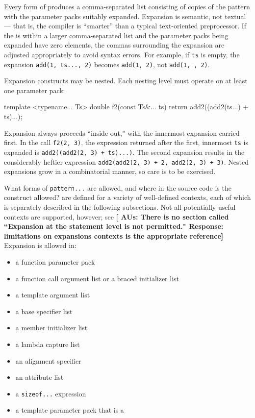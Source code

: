\noindent Every form of  produces a comma-separated list
consisting of copies of the pattern with the parameter packs suitably
expanded. Expansion is semantic, not textual --- that is, the compiler
is ``smarter'' than a typical text-oriented preprocessor. If the
 is within a larger comma-separated list and the
parameter packs being expanded have zero elements, the commas
surrounding the expansion are adjusted appropriately to avoid syntax
errors. For example, if \lstinline!ts! is empty, the expansion
\lstinline!add(1,!~\lstinline!ts...,!~\lstinline!2)! becomes
\lstinline!add(1,!~\lstinline!2)!, not \lstinline!add(1,!~\lstinline!,!~\lstinline!2)!.

Expansion constructs may be nested. Each nesting level must operate on
at least one parameter pack:

\begin{emcppslisting}[emcppsbatch=e25]
template <typename... Ts>
double f2(const Ts&... ts)
{
    return add2((add2(ts...) + ts)...);
}
\end{emcppslisting}
    

\noindent Expansion always proceeds ``inside out,'' with the innermost expansion
carried first. In the call \lstinline!f2(2,!~\lstinline!3)!, the expression
returned after the first, innermost \lstinline!ts! is expanded is
\lstinline!add2((add2(2,!~\lstinline!3)!~\lstinline!+!~\lstinline!ts)...)!. The
second expansion results in the considerably heftier expression
\lstinline!add2(add2(2,!~\lstinline!3)!~\lstinline!+!~\lstinline!2,!~\lstinline!add2(2,!~\lstinline!3)!~\lstinline!+!~\lstinline!3)!.
Nested expansions grow in a combinatorial manner, so care is to be
exercised.

What forms of \lstinline!pattern...! are allowed, and where in the source
code is the construct allowed?  are
defined for a variety of well-defined contexts, each of which is
separately described in the following subsections. Not all potentially
useful contexts are supported, however; see \textbf{[ AUs: There is no section called ``Expansion at the statement level is not permitted." Response: limitations on expansions contexts is the appropriate reference]}
Expansion is allowed in:
\begin{itemize}
\item{a function parameter pack}
\item{a function call argument list or a braced initializer list}
\item{a template argument list}
\item{a base specifier list}
\item{a member initializer list}
\item{a lambda capture list}
\item{an alignment specifier}
\item{an attribute list}
\item{a \lstinline!sizeof...! expression}
\item{a template parameter pack that is a }
\end{itemize}

